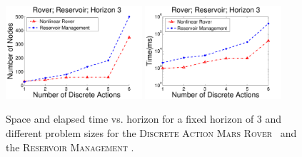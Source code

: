 \documentclass[twoside,11pt]{article}
\newcommand{\MarsRover}{\textsc{Mars Rover }}
\newcommand{\WaterReservoir}{\textsc{Reservoir Management }}
\begin{document}
\begin{figure}[tbp!]
\vspace{-2mm}
\centering
\includegraphics[width=0.45\textwidth]{Figures2/camdp/disRovResNode2.pdf}
\hspace{2mm}
\includegraphics[width=0.45\textwidth]{Figures2/camdp/disRovResTime2.pdf}
\vspace{-2mm}
\caption{%
Space and elapsed time vs. horizon for a fixed horizon of 3 and different problem sizes for the \textsc{Discrete Action} \MarsRover\ and the \WaterReservoir. 
}
\label{fig:roverDisSize}
\vspace{-5mm}
\end{figure}
%
\end{document}
